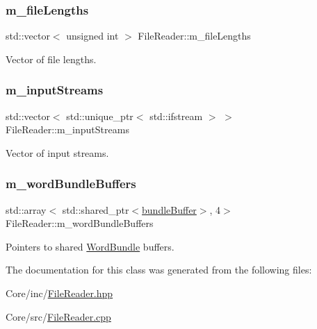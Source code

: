 \mbox{\label{class_file_reader_a7269438e7187e9abbdde1361a46d1fa6}} 
\subsubsection{\texorpdfstring{m\+\_\+file\+Lengths}{m\_fileLengths}}
{\footnotesize\ttfamily std\+::vector$<$ unsigned int $>$ File\+Reader\+::m\+\_\+file\+Lengths\hspace{0.3cm}{\ttfamily [private]}}



Vector of file lengths. 

\mbox{\label{class_file_reader_a8dfdb072d4bb1052a52d7be93fb44f07}} 
\subsubsection{\texorpdfstring{m\+\_\+input\+Streams}{m\_inputStreams}}
{\footnotesize\ttfamily std\+::vector$<$ std\+::unique\+\_\+ptr$<$ std\+::ifstream $>$ $>$ File\+Reader\+::m\+\_\+input\+Streams\hspace{0.3cm}{\ttfamily [private]}}



Vector of input streams. 

\mbox{\label{class_file_reader_a038d1362d7e0458b3450ab8584eab688}} 
\subsubsection{\texorpdfstring{m\+\_\+word\+Bundle\+Buffers}{m\_wordBundleBuffers}}
{\footnotesize\ttfamily std\+::array$<$ std\+::shared\+\_\+ptr$<$\hyperlink{class_file_reader_ac755c1e271610c2c12a7fc5b55cc048b}{bundle\+Buffer}$>$, 4$>$ File\+Reader\+::m\+\_\+word\+Bundle\+Buffers\hspace{0.3cm}{\ttfamily [private]}}



Pointers to shared \hyperlink{class_word_bundle}{Word\+Bundle} buffers. 



The documentation for this class was generated from the following files\+:\begin{DoxyCompactItemize}
\item 
Core/inc/\hyperlink{_file_reader_8hpp}{File\+Reader.\+hpp}\item 
Core/src/\hyperlink{_file_reader_8cpp}{File\+Reader.\+cpp}\end{DoxyCompactItemize}
